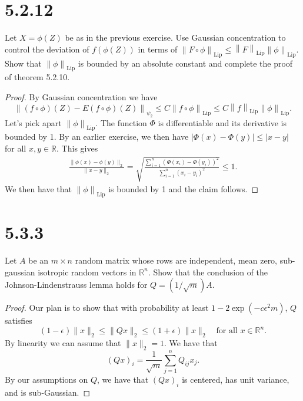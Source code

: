 \documentclass[11pt,letterpaper]{report}
\newcommand{\reals}{\mathbb{R}}
\newcommand{\subg}[1]{\left\|{#1}\right\|_{\psi_2}}
\newcommand{\Lip}[1]{\left\|{#1}\right\|_{\text{Lip}}}
\begin{document}
\section*{5.2.12}
Let $X = \phi(Z)$ be as in the previous exercise. Use Gaussian concentration to control the deviation of $f(\phi(Z))$ in terms of $\Lip{F\circ \phi}\leq \Lip{F}\Lip{\phi}$. Show that $\Lip{\phi}$ is bounded by an absolute constant and complete the proof of theorem 5.2.10.
\begin{proof}
	By Gaussian concentration we have
	\[
	\subg{(f\circ \phi)(Z) - E(f\circ \phi)(Z)}\leq C\Lip{f\circ \phi} \leq C\Lip{f}\Lip{\phi}.
	\]
	Let's pick apart $\Lip{\phi}$. The function $\Phi$ is differentiable and its derivative is bounded by 1. By an earlier exercise, we then have $|\Phi(x)-\Phi(y)|\leq |x-y|$ for all $x,y\in \reals$. This gives
	\begin{align*}
		\frac{\|\phi(x)-\phi(y)\|_2}{\|x-y\|_2} = \sqrt{\frac{\sum_{i=1}^n(\Phi(x_i)-\Phi(y_i))^2}{\sum_{i=1}^n(x_i-y_i)^2}} \leq 1.
	\end{align*}
	We then have that $\Lip{\phi}$ is bounded by 1 and the claim follows.
\end{proof}










\section*{5.3.3}
Let $A$ be an $m\times n$ random matrix whose rows are independent, mean zero, sub-gaussian isotropic random vectors in $\reals^n$. Show that the conclusion of the Johnson-Lindenstrauss lemma holds for $Q = (1/\sqrt{m})A$.
\begin{proof}
	Our plan is to show that with probability at least $1-2\exp(-c\epsilon^2 m)$, $Q$ satisfies
	\[
	(1-\epsilon)\|x\|_2 \leq \|Qx\|_2 \leq (1+\epsilon)\|x\|_2\quad\text{for all }x\in \reals^n.
	\]
	By linearity we can assume that $\|x\|_2 = 1$. We have that
	\[
	(Qx)_i = \frac{1}{\sqrt{m}}\sum_{j=1}^nQ_{ij}x_j.
	\]
	By our assumptions on $Q$, we have that $(Qx)_i$ is centered, has unit variance, and is sub-Gaussian.
\end{proof}
\end{document}
